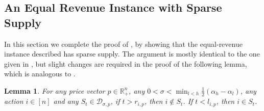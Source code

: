 \documentclass[11pt]{article}
\newtheorem{lemma}{Lemma}
\newcommand{\reals}{\mathbb{R}}
\newcommand{\supply}[2]{\mathcal{D}_{{#1},{#2}}}
\newcommand{\supSigP}{\supply{\sigma}{p}}
\begin{document}
\subsection{An Equal Revenue Instance with Sparse Supply}\label{sec:eqRevWithSparse_SupMod_c}

In this section we complete the proof of , by showing that the equal-revenue instance described has sparse supply. 
The argument is mostly identical to the one given in , but slight changes are required in the proof of the following lemma, which is analogous to .
 \begin{lemma}\label{lem:RLintervals_SupMod_c}
    For any price vector $p \in \reals_{+}^n$, any 
    $0 < \sigma < \min_{l < h} \frac{1}{2}(\alpha_h - \alpha_l)$,
     any action $i \in [n]$ and any $S_t \in \supSigP$, if $t > r_{i,p}$, then $i \notin S_t$. If $t < l_{i,p}$, then $i \in S_t$.
\end{lemma}
\end{document}
